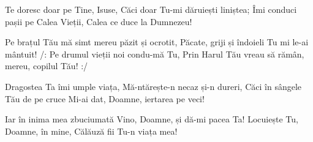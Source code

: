 \beginverse
Te doresc doar pe Tine, Isuse,
Căci doar Tu-mi dăruiești liniștea;
Îmi conduci pașii pe Calea Vieții,
Calea ce duce la Dumnezeu!
\endverse

\beginchorus
Pe brațul Tău mă simt mereu păzit și ocrotit,
Păcate, griji și îndoieli Tu mi le-ai mântuit!
/: Pe drumul vieții noi condu-mă Tu,
Prin Harul Tău vreau să rămân, mereu, copilul Tău! :/
\endchorus

\beginverse
Dragostea Ta îmi umple viața,
Mă-ntărește-n necaz și-n dureri,
Căci în sângele Tău de pe cruce
Mi-ai dat, Doamne, iertarea pe veci!
\endverse

\beginverse
Iar în inima mea zbuciumată
Vino, Doamne, și dă-mi pacea Ta!
Locuiește Tu, Doamne, în mine,
Călăuză fii Tu-n viața mea!
\endverse
\endsong